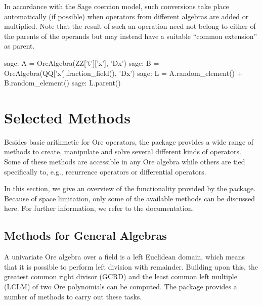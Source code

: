 \documentclass{llncs}
\begin{document}
In accordance with the Sage coercion model, such conversions take place automatically (if possible) 
when operators from different algebras are added or multiplied. Note that the result of such an operation
need not belong to either of the parents of the operands but may instead have a suitable ``common extension'' 
as parent. 

\begin{sageexample}
  sage: A = OreAlgebra(ZZ['t']['x'], 'Dx')
  sage: B = OreAlgebra(QQ['x'].fraction_field(), 'Dx')
  sage: L = A.random_element() + B.random_element()
  sage: L.parent()
\end{sageexample}

\section{Selected Methods}\label{sec:4}

Besides basic arithmetic for Ore operators, the package provides a wide range of
methods to create, manipulate and solve several different kinds of operators.
Some of these methods are accessible in any Ore algebra while others are tied
specifically to, e.g., recurrence operators or differential operators. 

In this section, we give an overview of the functionality provided by
the package. Because of space limitation, only some of the available methods
can be discussed here. For further information, we refer to the documentation. 

\subsection{Methods for General Algebras}

A univariate Ore algebra over a field is a left Euclidean domain, which means
that it is possible to perform left division with remainder. Building upon this,
the greatest common right divisor (GCRD) and the least common left multiple
(LCLM) of two Ore polynomials can be computed. The package provides a number of
methods to carry out these tasks.
\end{document}
